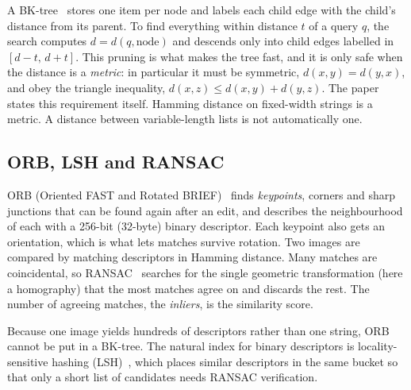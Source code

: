 A BK-tree~\cite{burkhard1973} stores one item per node and labels each child edge with the
child's distance from its parent. To find everything within distance $t$ of a query $q$, the
search computes $d=d(q,\text{node})$ and descends only into child edges labelled in
$[d-t,\,d+t]$. This pruning is what makes the tree fast, and it is only safe when the
distance is a \emph{metric}: in particular it must be symmetric, $d(x,y)=d(y,x)$, and obey the
triangle inequality, $d(x,z)\le d(x,y)+d(y,z)$. The paper states this requirement itself.
Hamming distance on fixed-width strings is a metric. A distance between variable-length lists
is not automatically one.

\subsection{ORB, LSH and RANSAC}

ORB (Oriented FAST and Rotated BRIEF)~\cite{rublee2011} finds \emph{keypoints}, corners and
sharp junctions that can be found again after an edit, and describes the neighbourhood of
each with a 256-bit (32-byte) binary descriptor. Each keypoint also gets an orientation, which
is what lets matches survive rotation. Two images are compared by matching descriptors in
Hamming distance. Many matches are coincidental, so RANSAC~\cite{fischler1981} searches for
the single geometric transformation (here a homography) that the most matches agree on and
discards the rest. The number of agreeing matches, the \emph{inliers}, is the similarity
score.

Because one image yields hundreds of descriptors rather than one string, ORB cannot be put in
a BK-tree. The natural index for binary descriptors is locality-sensitive hashing
(LSH)~\cite{gionis1999}, which places similar descriptors in the same bucket so that only a
short list of candidates needs RANSAC verification.
